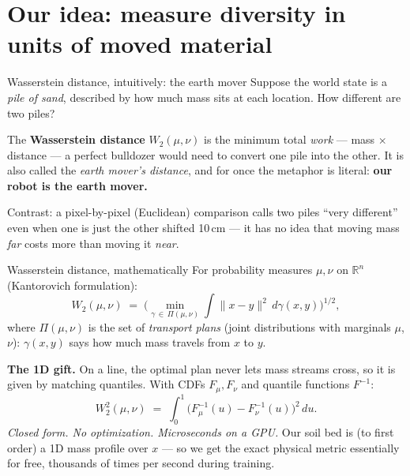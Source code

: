 \documentclass[aspectratio=169,11pt]{beamer}
\begin{document}
\section{Our idea: measure diversity in units of moved material}

\begin{frame}{Wasserstein distance, intuitively: the earth mover}
Suppose the world state is a \emph{pile of sand}, described by how much mass sits at each location. How different are two piles?

\begin{center}
\end{center}

The \textbf{Wasserstein distance} $W_2(\mu,\nu)$ is the minimum total \emph{work} --- mass $\times$ distance --- a perfect bulldozer would need to convert one pile into the other. It is also called the \emph{earth mover's distance}, and for once the metaphor is literal: \textbf{our robot is the earth mover.}

\medskip
Contrast: a pixel-by-pixel (Euclidean) comparison calls two piles ``very different'' even when one is just the other shifted 10\,cm --- it has no idea that moving mass \emph{far} costs more than moving it \emph{near}.
\end{frame}

\begin{frame}{Wasserstein distance, mathematically}
For probability measures $\mu,\nu$ on $\mathbb{R}^n$ (Kantorovich formulation):
\[
W_2(\mu,\nu) \;=\; \Big( \min_{\gamma \,\in\, \Pi(\mu,\nu)} \int \|x-y\|^2 \, d\gamma(x,y) \Big)^{1/2},
\]
where $\Pi(\mu,\nu)$ is the set of \emph{transport plans} (joint distributions with marginals $\mu$, $\nu$): $\gamma(x,y)$ says how much mass travels from $x$ to $y$.

\medskip
\textbf{The 1D gift.} On a line, the optimal plan never lets mass streams cross, so it is given by matching quantiles. With CDFs $F_\mu, F_\nu$ and quantile functions $F^{-1}$:
\[
W_2^2(\mu,\nu) \;=\; \int_0^1 \big( F_\mu^{-1}(u) - F_\nu^{-1}(u) \big)^2 \, du .
\]
\emph{Closed form. No optimization. Microseconds on a GPU.} Our soil bed is (to first order) a 1D mass profile over $x$ --- so we get the exact physical metric essentially for free, thousands of times per second during training.
\end{frame}
\end{document}
